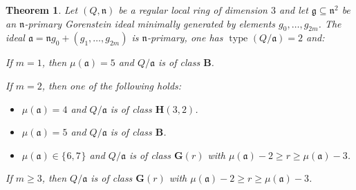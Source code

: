 \documentclass{amsart}
\theoremstyle{bfupright head,upright body}
\theoremstyle{fixed bf head,slanted body}
\newtheorem{thm}[res]{Theorem}          \newtheorem*{thm*}{Theorem}
\theoremstyle{fixed bf head,upright body}
\theoremstyle{numbered paragraph}
\newlength{\thmlistleft}        %
\newlength{\thmlistright}       %
\newlength{\thmlistpartopsep}   %
\newlength{\thmlisttopsep}      %
\newlength{\thmlistparsep}      %
\newlength{\thmlistitemsep}     %
\newcounter{prt}
\newenvironment{prt}{\begin{list}{\upshape (\alph{prt})}%
    {\usecounter{prt}%
      \setlength{\leftmargin}{\thmlistleft}%
      \setlength{\labelwidth}{\thmlistleft}%
      \setlength{\rightmargin}{\thmlistright}%
      \setlength{\partopsep}{\thmlistpartopsep}%
      \setlength{\topsep}{\thmlisttopsep}%
      \setlength{\parsep}{\thmlistparsep}%
      \setlength{\itemsep}{\thmlistitemsep}}}%
  {\end{list}}%
\newcommand{\set}[2][\mspace{1mu}]{\{#1 #2 #1\}}
\newcommand{\n}{\mathfrak{n}}
\newcommand{\type}[2][R]{\operatorname{type}_{#1}#2}
\newcommand{\clB}{\mathbf{B}}
\newcommand{\clG}[1]{\mathbf{G}(#1)}
\newcommand{\clH}[1]{\mathbf{H}(#1)}
\newcommand{\fa}{\mathfrak{a}}
\newcommand{\fg}{\mathfrak{g}}
\numberwithin{equation}{res}
\begin{document}
\begin{thm}
  \label{thm:2}
  Let $(Q,\n)$ be a regular local ring of dimension $3$ and let
  \mbox{$\fg \subseteq \n^2$} be an $\n$-primary Gorenstein ideal
  minimally generated by elements $g_0,\ldots,g_{2m}$. The ideal $\fa
  = \n g_0 + (g_1,\ldots,g_{2m})$ is $\n$-primary, one has
  $\type[]{(Q/\fa)} =2$ and:
  \begin{prt}
  \item If $m=1$, then $\mu(\fa)=5$ and $Q/\fa$ is of class $\clB$.
  \item If $m=2$, then one of the following holds:
    \begin{itemize}
    \item $\mu(\fa)=4$ and $Q/\fa$ is of class $\clH{3,2}$.
    \item $\mu(\fa)=5$ and $Q/\fa$ is of class $\clB$.
    \item $\mu(\fa) \in \set{6,7}$ and $Q/\fa$ is of class $\clG{r}$
      with $\mu(\fa)-2\ge r \ge \mu(\fa)-3$.
    \end{itemize}
  \item If $m \ge 3$, then $Q/\fa$ is of class $\clG{r}$ with
    $\mu(\fa)-2\ge r \ge \mu(\fa)-3$.
  \end{prt}
\end{thm}
\end{document}
